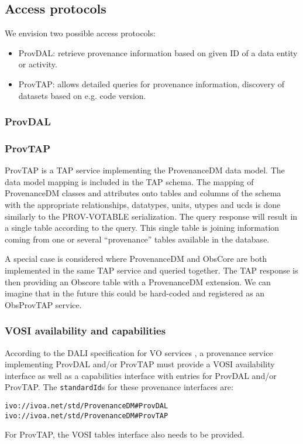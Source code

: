 \subsection{Access protocols}
\label{sec:access_protocols}
We envision two possible access protocols:
\begin{itemize}
\item ProvDAL: retrieve provenance information based on given ID of a data entity or activity.
\item ProvTAP: allows detailed queries for provenance information, discovery of datasets based on e.g. code version.
\end{itemize}

\subsubsection{ProvDAL}



\subsubsection{ProvTAP}
ProvTAP is a TAP service implementing the ProvenanceDM data model. The data model mapping is included in the TAP schema. The mapping of ProvenanceDM classes and attributes onto tables and columns of the schema with the appropriate relationships, datatypes, units, utypes and ucds is done similarly to the PROV-VOTABLE serialization. The query response will result in a single table according to the query.
This single table is joining information coming from one or several ``provenance'' tables available in the database.

A special case is considered where ProvenanceDM and ObsCore are both implemented in the same TAP service and queried together. The TAP response is then providing an Obscore table with a ProvenanceDM extension. We can imagine that in the future this could be hard-coded and registered as an ObsProvTAP service.






\subsubsection{VOSI availability and capabilities}
According to the DALI specification for VO services \citep{std:DALI}, a provenance service implementing ProvDAL and/or ProvTAP must provide a VOSI availability interface as well as a capabilities interface with entries for ProvDAL and/or ProvTAP. The \texttt{standardId}s for these provenance interfaces are:

\begin{verbatim}
ivo://ivoa.net/std/ProvenanceDM#ProvDAL
ivo://ivoa.net/std/ProvenanceDM#ProvTAP
\end{verbatim}

For ProvTAP, the VOSI tables interface also needs to be provided.

